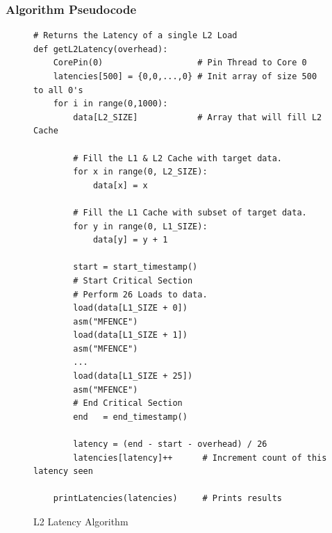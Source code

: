 \documentclass[bsc,frontabs,twoside,singlespacing,parskip,deptreport]{infthesis}     %
\begin{document}
\subsubsection{Algorithm Pseudocode}
\begin{figure}[h!]
    \begin{verbatim}
# Returns the Latency of a single L2 Load
def getL2Latency(overhead):
    CorePin(0)                   # Pin Thread to Core 0
    latencies[500] = {0,0,...,0} # Init array of size 500 to all 0's
    for i in range(0,1000):
        data[L2_SIZE]            # Array that will fill L2 Cache
        
        # Fill the L1 & L2 Cache with target data.
        for x in range(0, L2_SIZE):
            data[x] = x
        
        # Fill the L1 Cache with subset of target data.
        for y in range(0, L1_SIZE):
            data[y] = y + 1
            
        start = start_timestamp()
        # Start Critical Section
        # Perform 26 Loads to data.
        load(data[L1_SIZE + 0])
        asm("MFENCE")
        load(data[L1_SIZE + 1])
        asm("MFENCE")
        ...
        load(data[L1_SIZE + 25])
        asm("MFENCE")
        # End Critical Section
        end   = end_timestamp()
        
        latency = (end - start - overhead) / 26
        latencies[latency]++      # Increment count of this latency seen
        
    printLatencies(latencies)     # Prints results
    \end{verbatim}
    \caption{L2 Latency Algorithm}
    \label{fig:l2-lat-algo}
\end{figure}
\end{document}
